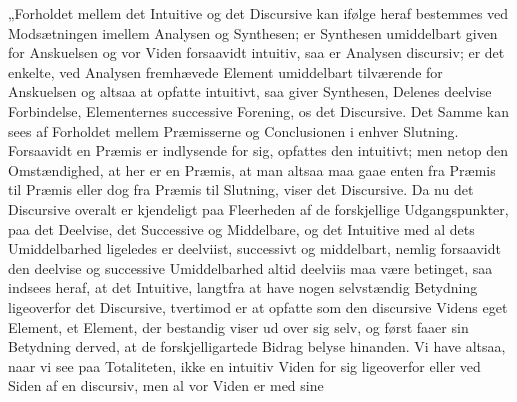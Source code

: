 \documentclass[12pt]{book}
\newcommand{\opage}[1]{\marginnote{\footnotesize\textit{[#1]}}}
\begin{document}
\opage{246} „Forholdet mellem det Intuitive og det Discursive kan ifølge heraf bestemmes ved Modsætningen
imellem Analysen og Synthesen; er Synthesen umiddelbart given for Anskuelsen og vor Viden forsaavidt
intuitiv, saa er Analysen discursiv; er det enkelte, ved Analysen fremhævede Element umiddelbart
tilværende for Anskuelsen og altsaa at opfatte intuitivt, saa giver Synthesen, Delenes deelvise
Forbindelse, Elementernes successive Forening, os det Discursive. Det Samme kan sees af Forholdet
mellem Præmisserne og Conclusionen i enhver Slutning. Forsaavidt en Præmis er indlysende for sig,
opfattes den intuitivt; men netop den Omstændighed, at her er en Præmis, at man altsaa maa gaae
enten fra Præmis til Præmis eller dog fra Præmis til Slutning, viser det Discursive. Da nu det
Discursive overalt er kjendeligt paa Fleerheden af de forskjellige Udgangspunkter, paa det Deelvise,
det Successive og Middelbare, og det Intuitive med al dets Umiddelbarhed ligeledes er deelviist,
successivt og middelbart, nemlig forsaavidt den deelvise og successive Umiddelbarhed altid deelviis
maa være betinget, saa indsees heraf, at det Intuitive, langtfra at have nogen selvstændig Betydning
ligeoverfor det Discursive, tvertimod er at opfatte som den discursive Videns eget Element, et
Element, der bestandig viser ud over sig selv, og først faaer sin Betydning derved, at de
forskjelligartede Bidrag belyse hinanden. Vi have altsaa, naar vi see paa Totaliteten, ikke en
intuitiv Viden for sig ligeoverfor eller ved Siden af en discursiv, men al vor Viden er med sine
\end{document}
